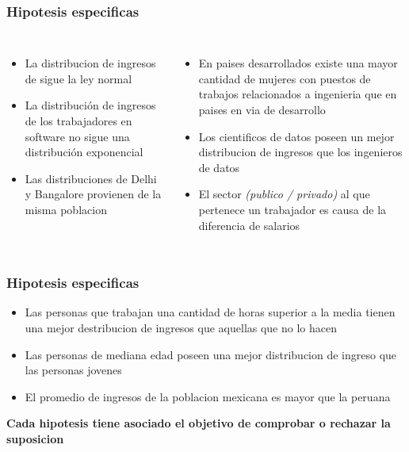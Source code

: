 \documentclass{beamer}
\begin{document}
\begin{frame}
\frametitle{Hipotesis especificas}

\begin{columns}

  \begin{itemize}
      \item La distribucion de ingresos de  sigue
        la ley normal
      \item La distribución de ingresos de los trabajadores en software
        no sigue una distribución exponencial
      \item Las distribuciones de Delhi y Bangalore provienen de la
        misma poblacion
  \end{itemize}


  \begin{itemize}
      \item En paises desarrollados existe una mayor cantidad
        de mujeres con puestos de trabajos relacionados a ingenieria que en paises en via
        de desarrollo
      \item Los cientificos de datos poseen un mejor distribucion de ingresos
        que los ingenieros de datos
      \item El sector \textit{(publico / privado)} al que pertenece un trabajador
        es causa de la diferencia de salarios
  \end{itemize}
\end{columns}
\end{frame}


\begin{frame}
\frametitle{Hipotesis especificas}
  \begin{itemize}
      \item Las personas que trabajan una cantidad de horas superior a
        la media tienen una mejor destribucion de ingresos que aquellas
        que no lo hacen
      \item Las personas de mediana edad poseen una mejor distribucion
        de ingreso que las personas jovenes
      \item El promedio de ingresos de la poblacion mexicana es mayor
        que la peruana
  \end{itemize}

  \textbf{Cada hipotesis tiene asociado el objetivo de comprobar
  o rechazar la suposicion}

\end{frame}
\end{document}
